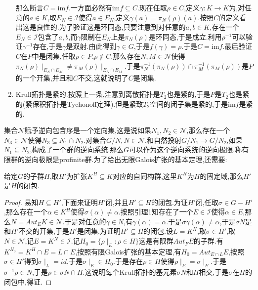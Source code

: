 \begin{enumerate}
	那么断言$C=\mathrm{im}f$.一方面必然有$\mathrm{im}f\subseteq C$.现在任取$\rho\in C$,定义$\gamma:K\to K$为,对任意的$a\in K$,取$E_N\in \mathscr{I}$使得$a\in E_N$,定义$\gamma(a)=\pi_N(\rho)(a)$.按照$C$的定义看出这是良性的.为了验证这是环同态,只要注意到对任意的$a,b\in K$,存在一个$E_N\in\mathscr{I}$包含了$a,b$,而$\gamma$限制在$E_N$上是$\pi_N(\rho)$是环同态,于是成立.利用$\rho^{-1}$可以验证$\gamma^{-1}$存在,于是$\gamma$是双射.由此得到$\gamma\in G$,于是$f(\gamma)=\rho$.于是$C=\mathrm{im}f$.最后验证$C$在$P$中是闭集,任取$\rho\in P$,$\rho\not\in C$.那么存在$N,M\in\mathscr{N}$使得$\pi_N(\rho)\mid_{E_N\cap E_M}\not=\pi_M(\rho)\mid_{E_N\cap E_M}$.于是$\pi_N^ {-1}(\pi_N(\rho))\cap\pi_M^{-1}(\pi_M(\rho))$是$P$的一个开集,并且和$C$不交,这就说明了$C$是闭集.
	\item Krull拓扑是紧的.按照上一条,注意到离散拓扑是$T_2$也是紧的,于是$P$是$T_2$也是紧的(紧保积拓扑是Tychonoff定理).但是紧致$T_2$空间的闭子集是紧的,于是$\mathrm{im}f$是紧的.
\end{enumerate}

集合$\mathscr{N}$赋予逆向包含序是一个定向集,这是说如果$N_1,N_2\in\mathscr{N}$,那么存在一个$N_3\in\mathscr{N}$使得$N_3\subseteq N_1\cap N_2$.对集合$G/N,N\in\mathscr{N}$,和自然投射$G/N_1\to G/N_2$,如果$N_1\subseteq N_2$,构成了一个群的逆向系统.那么$G$可以作为这个逆向系统的逆向极限.称有限群的逆向极限是profinite群.为了给出无限Galois扩张的基本定理,还需要:

给定$G$的子群$H$,取$H'$为扩张$K^H\subseteq K$对应的自同构群,这里$K^H$为$H$的固定域,那么$H'$是$H$的闭包.
\begin{proof}
	
	易知$H\subseteq H'$,下面来证明$H'$闭,并且$H'\subseteq H$的闭包.为证$H'$闭,任取$\sigma\in G-H'$,那么存在一个$\alpha\in K^H$使得$\sigma(\alpha)\not=\alpha$.按照引理1知存在了一个$E\in \mathscr{I}$使得$\alpha\in E$,那么$N=Aut_EK\in\mathscr{N}$.于是对任意的$\gamma\in N$,有$\gamma(\alpha)=\alpha$.于是$\sigma\gamma(\alpha)\not=\alpha$,于是$\sigma N$是和$H'$不交的开集,于是$H'$是闭集.为证明$H'\subseteq H$的闭包.设$L=K^H$,取$\sigma\in H'$,取$N\in\mathscr{N}$,记$E=K^N\in\mathscr{I}$.记$H_0=\{\rho\mid_E:\rho\in H\}$这是有限群$Aut_FE$的子群.有$K^{H_0}=K^H\cap E=L\cap E$,按照有限Galois扩张的基本定理,有$H_0=Aut_{E\cap L}E$,按照$\sigma\in H'$得到$\sigma\mid_L=id$,于是$\sigma\mid_E\in H_0$.于是存在$\rho\in H$使得$\rho\mid_E=\sigma\mid_E$.于是$\sigma^{-1}\rho\in N$,于是$\rho\in\sigma N\cap H$.这说明每个Krull拓扑的基元素$\sigma N$和$H$相交,于是$\sigma$在$H$的闭包中,得证.
	
\end{proof}

